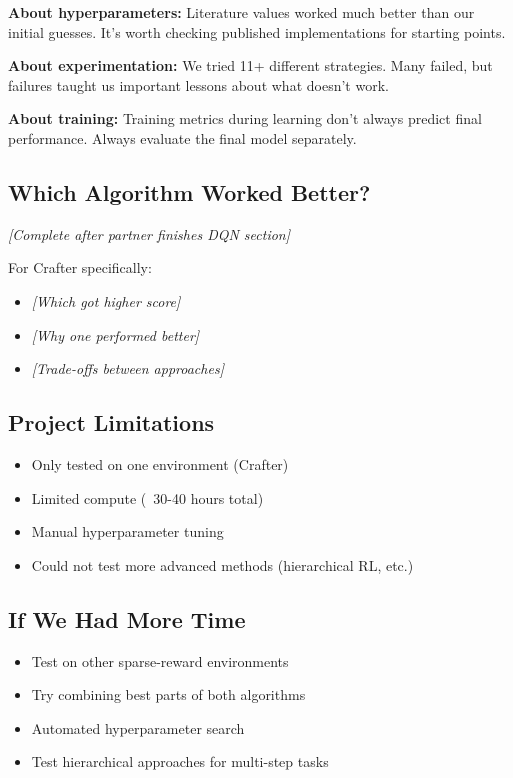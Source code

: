 \documentclass[conference]{IEEEtran}
\begin{document}
\textbf{About hyperparameters:} Literature values worked much better than our initial guesses. It's worth checking published implementations for starting points.

\textbf{About experimentation:} We tried 11+ different strategies. Many failed, but failures taught us important lessons about what doesn't work.

\textbf{About training:} Training metrics during learning don't always predict final performance. Always evaluate the final model separately.

\subsection{Which Algorithm Worked Better?}

\textit{[Complete after partner finishes DQN section]}

For Crafter specifically:
\begin{itemize}
    \item \textit{[Which got higher score]}
    \item \textit{[Why one performed better]}
    \item \textit{[Trade-offs between approaches]}
\end{itemize}

\subsection{Project Limitations}

\begin{itemize}
    \item Only tested on one environment (Crafter)
    \item Limited compute (~30-40 hours total)
    \item Manual hyperparameter tuning
    \item Could not test more advanced methods (hierarchical RL, etc.)
\end{itemize}

\subsection{If We Had More Time}

\begin{itemize}
    \item Test on other sparse-reward environments
    \item Try combining best parts of both algorithms
    \item Automated hyperparameter search
    \item Test hierarchical approaches for multi-step tasks
\end{itemize}
\end{document}
